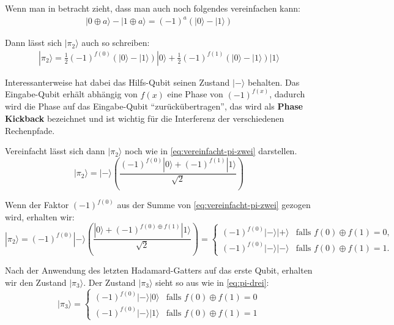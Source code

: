 Wenn man in betracht zieht, dass man auch noch folgendes vereinfachen kann:
\begin{align}
    |0\oplus a\rangle - |1\oplus a\rangle=(-1)^a(|0\rangle-|1\rangle)
\end{align}

Dann lässt sich $|\pi_2\rangle$ auch so schreiben:
\begin{align}
    |\pi_2\rangle=\frac{1}{2}(-1)^{f(0)}(|0\rangle-|1\rangle)|0\rangle+
    \frac{1}{2}(-1)^{f(1)}(|0\rangle-|1\rangle)|1\rangle
\end{align}

Interessanterweise hat dabei das Hilfs-Qubit seinen Zustand $|-\rangle$ behalten.
Das Eingabe-Qubit erhält abhängig von $f(x)$ eine Phase von $(-1)^{f(x)}$, dadurch wird die Phase auf das Eingabe-Qubit \enquote{zurückübertragen}, das wird als \textbf{Phase Kickback} bezeichnet und ist wichtig für die Interferenz der verschiedenen Rechenpfade.

Vereinfacht lässt sich dann $|\pi_2\rangle$ noch wie in \ref{eq:vereinfacht-pi-zwei} darstellen.
\begin{equation}
    |\pi_2\rangle=|-\rangle\left(\frac{
        (-1)^{f(0)}|0\rangle+(-1)^{f(1)}|1\rangle
    }
    {
        \sqrt{2}
    }\right)
    \label{eq:vereinfacht-pi-zwei}
\end{equation}

Wenn der Faktor $(-1)^{f(0)}$ aus der Summe von \ref{eq:vereinfacht-pi-zwei} gezogen wird, erhalten wir:
\begin{equation}
    |\pi_2\rangle=
    (-1)^{f(0)}|-\rangle\left(\frac{
        |0\rangle+(-1)^{f(0)\oplus f(1)}|1\rangle
    }
    {
        \sqrt{2}
    }\right)
    =
    \begin{cases}
(-1)^{f(0)} \lvert-\rangle\lvert+\rangle
& \text{falls } f(0) \oplus f(1) = 0, \\[6pt]
(-1)^{f(0)} \lvert-\rangle\lvert-\rangle
& \text{falls } f(0) \oplus f(1) = 1.
\end{cases}
\label{eq:wiederholt-vereinfacht-pi-zwei}
\end{equation}

Nach der Anwendung des letzten Hadamard-Gatters auf das erste Qubit, erhalten wir den Zustand $|\pi_3\rangle$.
Der Zustand $|\pi_3\rangle$ sieht so aus wie in \ref{eq:pi-drei}:
\begin{equation}
|\pi_3\rangle =
\begin{cases}
(-1)^{f(0)} |-\rangle |0\rangle
& \text{falls } f(0) \oplus f(1) = 0 \\[6pt]
(-1)^{f(0)} |-\rangle |1\rangle
& \text{falls } f(0) \oplus f(1) = 1
\end{cases}
\label{eq:pi-drei}
\end{equation}

